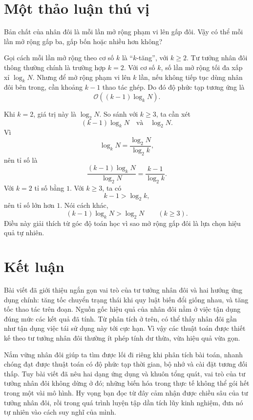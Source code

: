\documentclass[11pt]{article}
\newcommand{\Oh}{\mathcal{O}}
\begin{document}
\section{Một thảo luận thú vị}

Bản chất của nhân đôi là mỗi lần mở rộng phạm vi lên gấp đôi. Vậy có thể mỗi
lần mở rộng gấp ba, gấp bốn hoặc nhiều hơn không?

Gọi cách mỗi lần mở rộng theo cơ số $k$ là ``$k$-tăng'', với $k\ge 2$. Tư
tưởng nhân đôi thông thường chính là trường hợp $k=2$. Với cơ số $k$, số lần
mở rộng tối đa xấp xỉ $\log_k N$. Nhưng để mở rộng phạm vi lên $k$ lần, nếu
không tiếp tục dùng nhân đôi bên trong, cần khoảng $k-1$ thao tác ghép. Do đó
độ phức tạp tương ứng là
\[
  \Oh((k-1)\log_k N).
\]

Khi $k=2$, giá trị này là $\log_2 N$. So sánh với $k\ge 3$, ta cần xét
\[
  (k-1)\log_k N \quad\text{và}\quad \log_2 N.
\]
Vì
\[
  \log_k N=\frac{\log_2 N}{\log_2 k},
\]
nên tỉ số là
\[
  \frac{(k-1)\log_k N}{\log_2 N}
  =\frac{k-1}{\log_2 k}.
\]
Với $k=2$ tỉ số bằng $1$. Với $k\ge3$, ta có
\[
  k-1>\log_2 k,
\]
nên tỉ số lớn hơn $1$. Nói cách khác,
\[
  (k-1)\log_k N>\log_2 N\qquad (k\ge3).
\]
Điều này giải thích từ góc độ toán học vì sao mở rộng gấp đôi là lựa chọn
hiệu quả tự nhiên.

\section{Kết luận}

Bài viết đã giới thiệu ngắn gọn vai trò của tư tưởng nhân đôi và hai hướng
ứng dụng chính: tăng tốc chuyển trạng thái khi quy luật biến đổi giống nhau,
và tăng tốc thao tác trên đoạn. Nguồn gốc hiệu quả của nhân đôi nằm ở việc tận
dụng đúng mức các kết quả đã tính. Từ phân tích ở trên, có thể thấy nhân đôi
gần như tận dụng việc tái sử dụng này tới cực hạn. Vì vậy các thuật toán được
thiết kế theo tư tưởng nhân đôi thường ít phép tính dư thừa, vừa hiệu quả vừa
gọn.

Nắm vững nhân đôi giúp ta tìm được lối đi riêng khi phân tích bài toán, nhanh
chóng đạt được thuật toán có độ phức tạp thời gian, bộ nhớ và cài đặt tương
đối thấp. Tuy bài viết đã nêu hai dạng ứng dụng và khuôn tổng quát, vai trò
của tư tưởng nhân đôi không dừng ở đó; những biến hóa trong thực tế không thể
gói hết trong một vài mô hình. Hy vọng bạn đọc từ đây cảm nhận được chiều sâu
của tư tưởng nhân đôi, rồi trong quá trình luyện tập dần tích lũy kinh nghiệm,
đưa nó tự nhiên vào cách suy nghĩ của mình.
\end{document}
